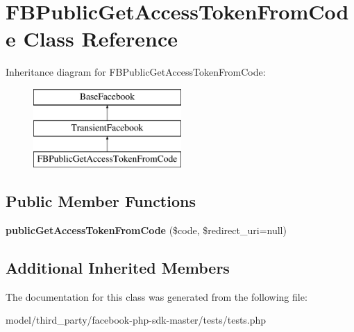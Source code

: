 \hypertarget{classFBPublicGetAccessTokenFromCode}{\section{F\-B\-Public\-Get\-Access\-Token\-From\-Code Class Reference}
\label{classFBPublicGetAccessTokenFromCode}
}
Inheritance diagram for F\-B\-Public\-Get\-Access\-Token\-From\-Code\-:\begin{figure}[H]
\begin{center}
\leavevmode
\includegraphics[height=3.000000cm]{classFBPublicGetAccessTokenFromCode}
\end{center}
\end{figure}
\subsection*{Public Member Functions}
\begin{DoxyCompactItemize}
\item 
\hypertarget{classFBPublicGetAccessTokenFromCode_a41c3f6f15f27fafc6f71b45c382a2ae7}{{\bfseries public\-Get\-Access\-Token\-From\-Code} (\$code, \$redirect\-\_\-uri=null)}\label{classFBPublicGetAccessTokenFromCode_a41c3f6f15f27fafc6f71b45c382a2ae7}

\end{DoxyCompactItemize}
\subsection*{Additional Inherited Members}


The documentation for this class was generated from the following file\-:\begin{DoxyCompactItemize}
\item 
model/third\-\_\-party/facebook-\/php-\/sdk-\/master/tests/tests.\-php\end{DoxyCompactItemize}
